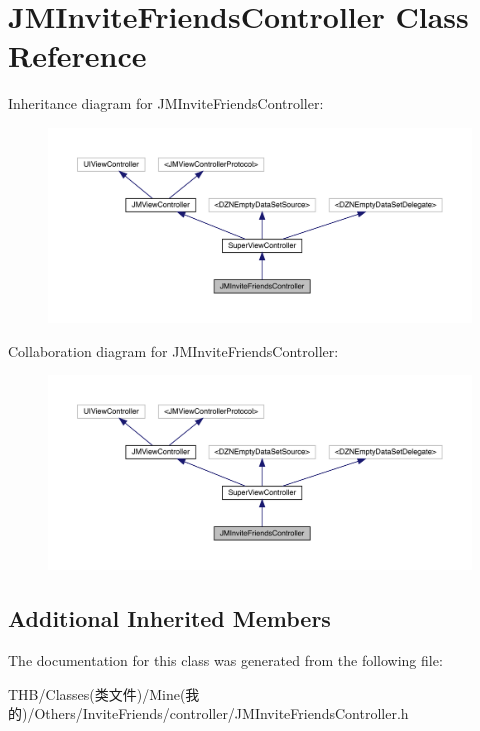 \hypertarget{interface_j_m_invite_friends_controller}{}\section{J\+M\+Invite\+Friends\+Controller Class Reference}
\label{interface_j_m_invite_friends_controller}


Inheritance diagram for J\+M\+Invite\+Friends\+Controller\+:\nopagebreak
\begin{figure}[H]
\begin{center}
\leavevmode
\includegraphics[width=350pt]{interface_j_m_invite_friends_controller__inherit__graph}
\end{center}
\end{figure}


Collaboration diagram for J\+M\+Invite\+Friends\+Controller\+:\nopagebreak
\begin{figure}[H]
\begin{center}
\leavevmode
\includegraphics[width=350pt]{interface_j_m_invite_friends_controller__coll__graph}
\end{center}
\end{figure}
\subsection*{Additional Inherited Members}


The documentation for this class was generated from the following file\+:\begin{DoxyCompactItemize}
\item 
T\+H\+B/\+Classes(类文件)/\+Mine(我的)/\+Others/\+Invite\+Friends/controller/J\+M\+Invite\+Friends\+Controller.\+h\end{DoxyCompactItemize}
